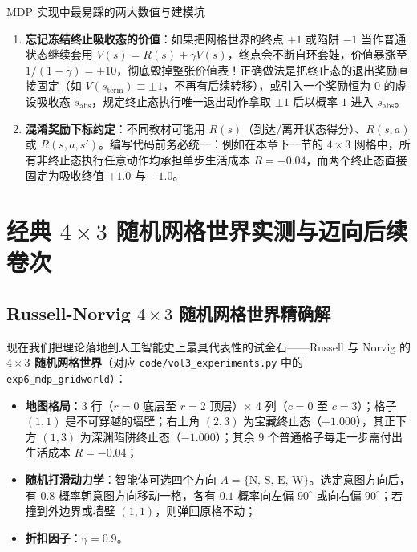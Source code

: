 \begin{failBox}{MDP 实现中最易踩的两大数值与建模坑}
\begin{enumerate}
  \item \textbf{忘记冻结终止吸收态的价值}：如果把网格世界的终点 $+1$ 或陷阱 $-1$ 当作普通状态继续套用 $V(s) = R(s) + \gamma V(s)$，终点会不断自环套娃，价值暴涨至 $1/(1-\gamma) = +10$，彻底毁掉整张价值表！正确做法是把终止态的退出奖励直接固定（如 $V(s_{\text{term}}) \equiv \pm 1$，不再有后续转移），或引入一个奖励恒为 $0$ 的虚设吸收态 $s_{\text{abs}}$，规定终止态执行唯一退出动作拿取 $\pm 1$ 后以概率 $1$ 进入 $s_{\text{abs}}$。
  \item \textbf{混淆奖励下标约定}：不同教材可能用 $R(s)$（到达/离开状态得分）、$R(s, a)$ 或 $R(s, a, s')$。编写代码前务必统一：例如在本章下一节的 $4\times 3$ 网格中，所有非终止态执行任意动作均承担单步生活成本 $R = -0.04$，而两个终止态直接固定为吸收终值 $+1.0$ 与 $-1.0$。
\end{enumerate}
\end{failBox}

\section{经典 $4\times 3$ 随机网格世界实测与迈向后续卷次}\label{sec:gridworld}

\subsection{Russell-Norvig $4\times 3$ 随机网格世界精确解}

现在我们把理论落地到人工智能史上最具代表性的试金石——Russell 与 Norvig 的 \textbf{$4\times 3$ 随机网格世界}（对应 \texttt{code/vol3\_experiments.py} 中的 \texttt{exp6\_mdp\_gridworld}）：
\begin{itemize}
  \item \textbf{地图格局}：3 行（$r=0$ 底层至 $r=2$ 顶层）$\times$ 4 列（$c=0$ 至 $c=3$）；格子 $(1, 1)$ 是不可穿越的墙壁；右上角 $(2, 3)$ 为宝藏终止态（$+1.000$），其正下方 $(1, 3)$ 为深渊陷阱终止态（$-1.000$）；其余 $9$ 个普通格子每走一步需付出生活成本 $R = -0.04$；
  \item \textbf{随机打滑动力学}：智能体可选四个方向 $A = \{\text{N, S, E, W}\}$。选定意图方向后，有 $0.8$ 概率朝意图方向移动一格，各有 $0.1$ 概率向左偏 $90^\circ$ 或向右偏 $90^\circ$；若撞到外边界或墙壁 $(1, 1)$，则弹回原格不动；
  \item \textbf{折扣因子}：$\gamma = 0.9$。
\end{itemize}

